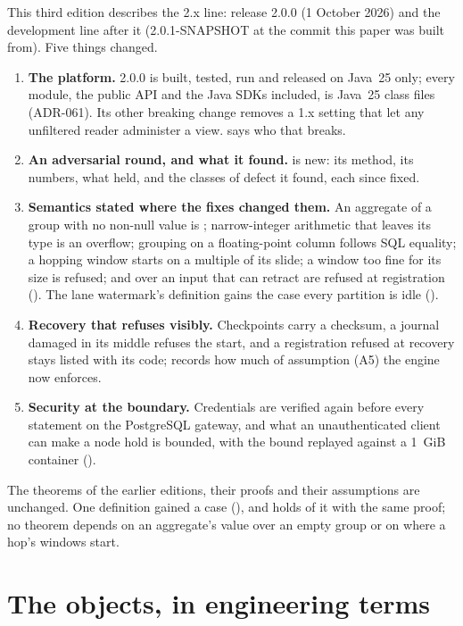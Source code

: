 \documentclass[11pt,a4paper]{article}
\renewcommand{\_}{\oldunderscore\allowbreak}
\newcommand{\code}[1]{\texttt{\pvbreakable{#1}}}
\begin{document}
This third edition describes the 2.x line: release 2.0.0 (1 October 2026) and the development line
after it (2.0.1-SNAPSHOT at the commit this paper was built from). Five things changed.
\begin{enumerate}[leftmargin=*,itemsep=2pt]
\item \textbf{The platform.} 2.0.0 is built, tested, run and released on Java~25 only; every module,
      the public API and the Java SDKs included, is Java~25 class files (ADR-061). Its other breaking
      change removes a 1.x setting that let any unfiltered reader administer a view. 
      says who that breaks.
\item \textbf{An adversarial round, and what it found.}  is new: its method, its
      numbers, what held, and the classes of defect it found, each since fixed.
\item \textbf{Semantics stated where the fixes changed them.} An aggregate of a group with no non-null
      value is \code{NULL}; narrow-integer arithmetic that leaves its type is an overflow; grouping on a
      floating-point column follows SQL equality; a hopping window starts on a multiple of its slide; a
      window too fine for its size is refused; \code{MIN} and \code{MAX} over an input that can retract
      are refused at registration (). The lane watermark's
      definition gains the case every partition is idle ().
\item \textbf{Recovery that refuses visibly.} Checkpoints carry a checksum, a journal damaged in its
      middle refuses the start, and a registration refused at recovery stays listed with its code;
       records how much of assumption (A5) the engine now enforces.
\item \textbf{Security at the boundary.} Credentials are verified again before every statement on the
      PostgreSQL gateway, and what an unauthenticated client can make a node hold is bounded, with the
      bound replayed against a 1~GiB container ().
\end{enumerate}
The theorems of the earlier editions, their proofs and their assumptions are unchanged. One definition
gained a case (), and  holds of it with the same proof; no theorem
depends on an aggregate's value over an empty group or on where a hop's windows start.

\section{The objects, in engineering terms}\label{sec:objects}
\end{document}
